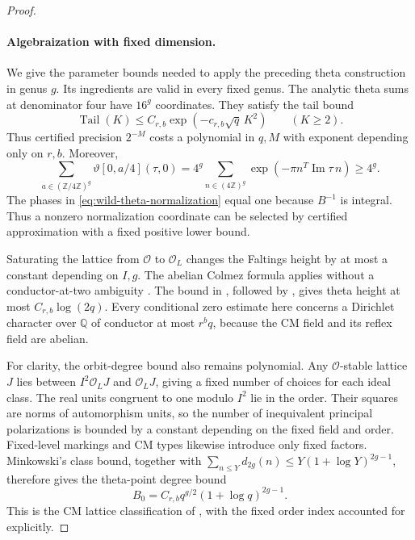 \documentclass[11pt]{article}
\theoremstyle{definition}
\theoremstyle{remark}
\begin{document}
\begin{proof}
\paragraph{Algebraization with fixed dimension.}
We give the parameter bounds needed to apply the preceding
theta construction in genus \(g\). Its ingredients are valid
in every fixed genus. The analytic theta sums at denominator
four have \(16^g\) coordinates. They satisfy the tail bound
\[
 \operatorname{Tail}(K)\leq
 C_{r,b}\exp(-c_{r,b}\sqrt q\,K^2)\qquad(K\geq2).
\]
Thus certified precision \(2^{-M}\) costs a polynomial in
\(q,M\) with exponent depending only on \(r,b\). Moreover,
\begin{equation}
 \sum_{a\in(\mathbb Z/4\mathbb Z)^g}
       \vartheta[0,a/4](\tau,0)
 =4^g\sum_{n\in(4\mathbb Z)^g}
       \exp(-\pi n^T\operatorname{Im}\tau\,n)\geq4^g.
 \label{eq:wild-theta-normalization}
\end{equation}
The phases in \eqref{eq:wild-theta-normalization} equal one because \(B^{-1}\) is integral.
Thus a nonzero normalization coordinate can be selected by
certified approximation with a fixed positive lower bound.

Saturating the lattice from \(\mathcal O\) to
\(\mathcal O_L\) changes the Faltings height by at most a
constant depending on \(I,g\). The abelian Colmez formula
applies without a conductor-at-two ambiguity
\citep[Theorem~0.3(ii), p.~631; Theorem~III.2.9(i), p.~680]{Colmez1993}.
The bound in \citet[Corollary~4.3, pp.~14--15; Theorem~4.8,
p.~18]{Wei2021}, followed by
\citet[Corollary~1.3(2), pp.~21--22]{Pazuki2012}, gives
theta height at most \(C_{r,b}\log(2q)\).
Every conditional zero estimate here concerns a Dirichlet
character over \(\mathbb Q\) of conductor at most \(r^bq\),
because the CM field and its reflex field are abelian.

For clarity, the orbit-degree bound also remains polynomial.
Any \(\mathcal O\)-stable lattice \(J\) lies between
\(I^2\mathcal O_LJ\) and \(\mathcal O_LJ\), giving a fixed
number of choices for each ideal class. The real units
congruent to one modulo \(I^2\) lie in the order. Their squares
are norms of automorphism units, so the number of inequivalent
principal polarizations is bounded by a constant depending on
the fixed field and order. Fixed-level markings and CM types
likewise introduce only fixed factors. Minkowski's class bound,
together with
\(\sum_{n\leq Y}d_{2g}(n)\leq Y(1+\log Y)^{2g-1}\),
therefore gives the theta-point degree bound
\begin{equation}
 B_0=C_{r,b}q^{g/2}(1+\log q)^{2g-1}.
 \label{eq:wild-theta-degree}
\end{equation}
This is the CM lattice classification of
\citet[Section~3, pp.~29--31]{MilneCM2020}, with the fixed
order index accounted for explicitly.


\end{proof}
\end{document}
